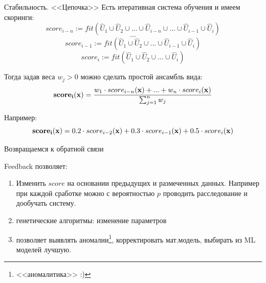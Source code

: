 \begin{frame}{Стабильность. <<Цепочка>>}\label{frame:chain_score}
	Есть итеративная система обучения и имеем скоринги:
	\begin{equation*}
	score_{i-n} := fit ( \hat U_{1} \cup \hat U_2 \cup ... \cup  \hat U_{i-n} \cup ... \cup \hat U_{i-1} \cup \hat U_{i}) 
	\end{equation*}
	\begin{equation*}
	...
	\end{equation*}
	\begin{equation*}
	score_{i-1} := fit ( \hat U_{1} \cup \hat U_2 \cup ... \cup  \hat U_{i-1} \cup \hat U_{i}) 
	\end{equation*}
	\begin{equation*}
	score_{i} := fit ( \hat U_{1} \cup \hat U_2 \cup ... \cup  \hat U_{i}) 
	\end{equation*}
	
	Тогда задав веса $w_j > 0$ можно сделать простой ансамбль вида:
	\begin{equation*}
	\bold {score_{i}}(\bold x) = \frac{w_1 \cdot score_{i-n}(\bold x) + ... + w_n \cdot score_{i}(\bold x)}{\sum_{j=1}^{n} w_j} 
	\end{equation*}
	
	Например:
	\begin{equation*}
	\bold {score_{i}}(\bold x) = 
		0.2 \cdot score_{i-2}(\bold x) 
		+ 0.3 \cdot score_{i-1}(\bold x) 
		+ 0.5 \cdot score_{i}(\bold x) 
	\end{equation*}
\end{frame}


\begin{frame}
	Возвращаемся к обратной связи
	\Large
	\begin{center}
	\end{center}
\end{frame}

\begin{frame}
	Feedback позволяет:
	\begin{enumerate}
		\item Изменить $score$ на основании предыдущих 
		и размеченных данных. Например при каждой сработке 
		можно с вероятностью $p$ проводить расследование и дообучать систему.
		\item генетические алгоритмы: изменение параметров
		\item позволяет выявлять аномалии\footnote{<<аномалитика>> :) },
		корректировать мат.модель, выбирать из ML моделей лучшую.
	\end{enumerate}
\end{frame}


